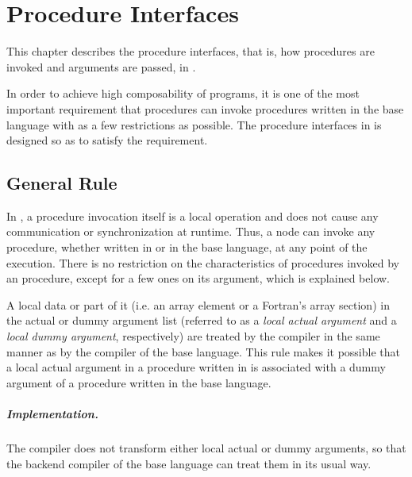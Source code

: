 \chapter{Procedure Interfaces}

This chapter describes the procedure interfaces, that is, how
procedures are invoked and arguments are passed, in {\XMP}.

In order to achieve high composability of {\XMP} programs, it is one of
the most important requirement that {\XMP} procedures can invoke
procedures written in the base language with as a few restrictions as
possible. The procedure interfaces in {\XMP} is designed so as to
satisfy the requirement.


\section{General Rule}

In {\XMP}, a procedure invocation itself is a local operation and does
not cause any communication or synchronization at runtime. Thus, a node
can invoke any procedure, whether written in {\XMP} or in the base
language, at any point of the execution.
%
There is no restriction on the characteristics of procedures invoked by
an {\XMP} procedure, except for a few ones on its argument, which is
explained below.

A local data or part of it (i.e. an array element or a Fortran's array
section) in the actual or dummy argument list (referred to as a {\it
local actual argument} and a {\it local dummy argument}, respectively)
are treated by the {\XMP} compiler in the same manner as by the compiler
of the base language.
%
This rule makes it possible that a local actual argument in a procedure
written in {\XMP} is associated with a dummy argument of a procedure
written in the base language.


\paragraph{Implementation.}

The {\XMP} compiler does not transform either local actual or dummy
arguments, so that the backend compiler of the base language can treat
them in its usual way.

\vspace{1.5zw}

